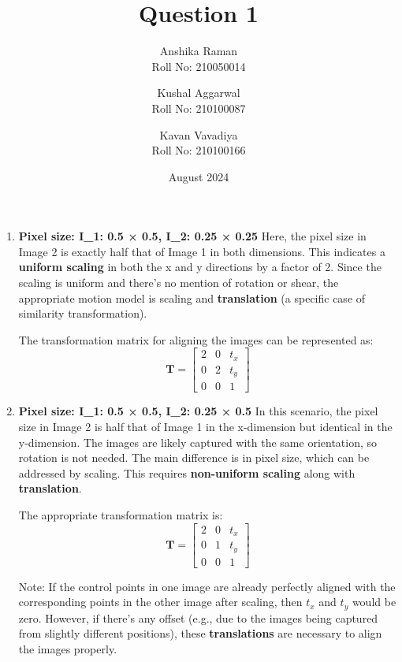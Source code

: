 \documentclass[a4paper,12pt]{article}
\title{Question 1}
\author{Anshika Raman \\ Roll No: 210050014
    \and Kushal Aggarwal \\ Roll No: 210100087
    \and Kavan Vavadiya \\ Roll No: 210100166}
\date{August 2024}
\begin{document}
\maketitle

\renewcommand{\cftsecleader}{\cftdotfill{\cftdotsep}}

\begin{enumerate}
    \item \textbf{Pixel size: I\_1: 0.5 × 0.5, I\_2: 0.25 × 0.25}
    Here, the pixel size in Image 2 is exactly half that of Image 1 in both dimensions. This indicates a \textbf{uniform scaling} in both the x and y directions by a factor of 2. Since the scaling is uniform and there’s no mention of rotation or shear, the appropriate motion model is scaling and \textbf{translation} (a specific case of similarity transformation).

The transformation matrix for aligning the images can be represented as:
    \[
    \mathbf{T} = \begin{bmatrix}
    2 & 0 & t_x \\
    0 & 2 & t_y \\
    0 & 0 & 1
    \end{bmatrix}
    \]
    
    \item \textbf{Pixel size: I\_1: 0.5 × 0.5, I\_2: 0.25 × 0.5}
    In this scenario, the pixel size in Image 2 is half that of Image 1 in the x-dimension but identical in the y-dimension. The images are likely captured with the same orientation, so rotation is not needed. The main difference is in pixel size, which can be addressed by scaling. This requires \textbf{non-uniform scaling} along with \textbf{translation}.

The appropriate transformation matrix is:
    \[
    \mathbf{T} = \begin{bmatrix}
    2 & 0 & t_x \\
    0 & 1 & t_y \\
    0 & 0 & 1
    \end{bmatrix}
    \]

    Note: If the control points in one image are already perfectly aligned with the corresponding points in the other image after scaling, then $t_x$ and $t_y$ would be zero. However, if there's any offset (e.g., due to the images being captured from slightly different positions), these \textbf{translations} are necessary to align the images properly.

  
\end{enumerate}
\end{document}
